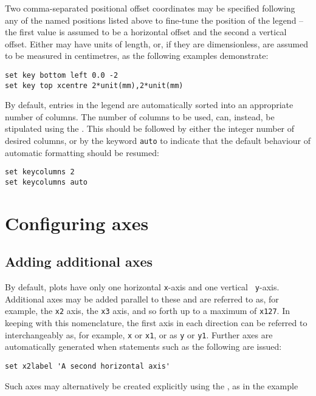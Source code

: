 Two comma-separated positional offset coordinates may be specified following
any of the named positions listed above to fine-tune the position of the legend
-- the first value is assumed to be a horizontal offset and the second a
vertical offset. Either may have units of length, or, if they are
dimensionless, are assumed to be measured in centimetres, as the following
examples demonstrate:

\begin{verbatim}
set key bottom left 0.0 -2
set key top xcentre 2*unit(mm),2*unit(mm)
\end{verbatim}

By default, entries in the legend are automatically sorted into an appropriate
number of columns. The number of columns to be used, can, instead, be
stipulated using the . This should be followed by
either the integer number of desired columns, or by the keyword {\tt auto} to
indicate that the default behaviour of automatic formatting should be resumed:

\begin{verbatim}
set keycolumns 2
set keycolumns auto
\end{verbatim}

\section{Configuring axes}

\subsection{Adding additional axes}
\label{sec:multiple_axes}

By default, plots have only one horizontal {\tt x}-axis and one vertical {\tt
y}-axis.  Additional axes may be added parallel to these and are referred to
as, for example, the {\tt x2} axis, the {\tt x3} axis, and so forth up to a
maximum of {\tt x127}.  In keeping with this nomenclature, the first axis in
each direction can be referred to interchangeably as, for example, {\tt x} or
{\tt x1}, or as {\tt y} or {\tt y1}.  Further axes are automatically generated
when statements such as the following are issued:

\begin{verbatim}
set x2label 'A second horizontal axis'
\end{verbatim}

\noindent Such axes may alternatively be created explicitly using the
, as in the example

